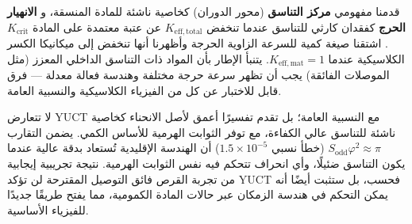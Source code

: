 \documentclass[12pt,a4paper]{article}
\newcommand{\Sodd}{S_{\mathrm{odd}}}
\newcommand{\Keffmat}{K_{\mathrm{eff,mat}}}
\newcommand{\Kefftot}{K_{\mathrm{eff,total}}}
\newcommand{\Kcrit}{K_{\mathrm{crit}}}
\begin{document}
	قدمنا مفهومي \textbf{مركز التناسق} (محور الدوران) كخاصية ناشئة للمادة المنسقة، و \textbf{الانهيار الحرج} كفقدان كارثي للتناسق عندما تنخفض \(\Kefftot\) عن عتبة معتمدة على المادة \(\Kcrit\). اشتقنا صيغة كمية للسرعة الزاوية الحرجة وأظهرنا أنها تنخفض إلى ميكانيكا الكسر الكلاسيكية عندما \(\Keffmat=1\). يتنبأ الإطار بأن المواد ذات التناسق الداخلي المعزز (مثل الموصلات الفائقة) يجب أن تظهر سرعة حرجة مختلفة وهندسة فعالة معدلة — فرق قابل للاختبار عن كل من الفيزياء الكلاسيكية والنسبية العامة.
	
	لا تتعارض YUCT مع النسبية العامة؛ بل تقدم تفسيرًا أعمق لأصل الانحناء كخاصية ناشئة للتناسق عالي الكفاءة، مع توفر الثوابت الهرمية للأساس الكمي. يضمن التقارب \(\Sodd \varphi^2 \approx \pi\) (خطأ نسبي \(1.5\times10^{-5}\)) أن الهندسة الإقليدية تُستعاد بدقة عالية عندما يكون التناسق ضئيلًا، وأي انحراف تتحكم فيه نفس الثوابت الهرمية. نتيجة تجريبية إيجابية من تجربة القرص فائق التوصيل المقترحة لن تؤكد YUCT فحسب، بل ستثبت أيضًا أنه يمكن التحكم في هندسة الزمكان عبر حالات المادة الكمومية، مما يفتح طريقًا جديدًا للفيزياء الأساسية.
	
\end{document}

